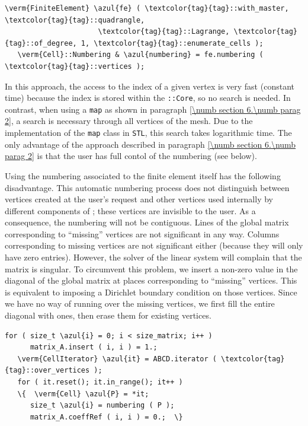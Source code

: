 \begin{Verbatim}[commandchars=\\\{\},formatcom=\small\tt,frame=single,
   label=parag-\ref{\numb section 6.\numb parag 4}.cpp,rulecolor=\color{coment},
   baselinestretch=0.94,framesep=2mm                                            ]
   \verm{FiniteElement} \azul{fe} ( \textcolor{tag}{tag}::with_master, \textcolor{tag}{tag}::quadrangle,
                      \textcolor{tag}{tag}::Lagrange, \textcolor{tag}{tag}::of_degree, 1, \textcolor{tag}{tag}::enumerate_cells );
   \verm{Cell}::Numbering & \azul{numbering} = fe.numbering ( \textcolor{tag}{tag}::vertices );
\end{Verbatim}

In this approach, the access to the index of a given vertex is very fast (constant time)
because the index is stored within the {\small\tt{}::Core}, so no search is needed.
In contrast, when using a {\small\tt map} as shown in paragraph
\ref{\numb section 6.\numb parag 2}, a search is necessary through all vertices of the mesh.
Due to the implementation of the {\small\tt map} class in {\tt STL}, this search takes
logarithmic time.
The only advantage of the approach described in paragraph \ref{\numb section 6.\numb parag 2}
is that the user has full contol of the numbering (see below).

Using the numbering associated to the finite element itself has the following disadvantage.
This automatic numbering process does not distinguish between vertices created at the user's
request and other vertices used internally by different components of {\maniFEM};
these vertices are invisible to the user.
As a consequence, the numbering will not be contiguous.
Lines of the global matrix corresponding to ``missing'' vertices are not significant in any way.
Columns corresponding to missing vertices are not significant either (because they will only
have zero entries).
However, the solver of the linear system will complain that the matrix is singular.
To circumvent this problem, we insert a non-zero value in the diagonal of the global matrix
at places corresponding to ``missing'' vertices.
This is equivalent to imposing a Dirichlet boundary condition on those vertices.
Since we have no way of running over the missing vertices, we first fill the entire
diagonal with ones, then erase them for existing vertices.

\begin{Verbatim}[commandchars=\\\{\},formatcom=\small\tt,frame=single,
   label=parag-\ref{\numb section 6.\numb parag 4}.cpp,rulecolor=\color{coment},
   baselinestretch=0.94,framesep=2mm                                            ]
   for ( size_t \azul{i} = 0; i < size_matrix; i++ )
      matrix_A.insert ( i, i ) = 1.;
   \verm{CellIterator} \azul{it} = ABCD.iterator ( \textcolor{tag}{tag}::over_vertices );
   for ( it.reset(); it.in_range(); it++ )
   \{  \verm{Cell} \azul{P} = *it;
      size_t \azul{i} = numbering ( P );
      matrix_A.coeffRef ( i, i ) = 0.;  \}
\end{Verbatim}

